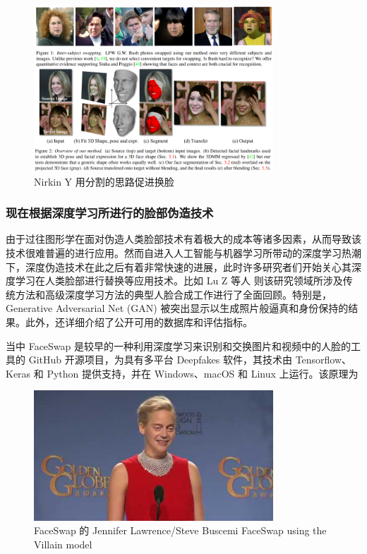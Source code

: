 \begin{figure}[htb]
\centering 
\includegraphics[width=0.80\textwidth]{img/ch1m6.png} 
\caption{Nirkin Y 用分割的思路促进换脸}
\label{Test}
\end{figure}

\subsubsection{现在根据深度学习所进行的脸部伪造技术}

由于过往图形学在面对伪造人类脸部技术有着极大的成本等诸多因素，从而导致该技术很难普遍的进行应用。然而自进入人工智能与机器学习所带动的深度学习热潮下，深度伪造技术在此之后有着非常快速的进展，此时许多研究者们开始关心其深度学习在人类脸部进行替换等应用技术。比如 Lu Z 等人 \cite{lu2017recent}则该研究领域所涉及传统方法和高级深度学习方法的典型人脸合成工作进行了全面回顾。特别是，Generative Adversarial Net (GAN) 被突出显示以生成照片般逼真和身份保持的结果。此外，还详细介绍了公开可用的数据库和评估指标。

当中 FaceSwap \cite{list1101} 是较早的一种利用深度学习来识别和交换图片和视频中的人脸的工具的 GitHub 开源项目，为具有多平台 Deepfakes 软件，其技术由 Tensorflow、Keras 和 Python 提供支持，并在 Windows、macOS 和 Linux 上运行。该原理为

\begin{figure}[htb]
\centering 
\includegraphics[width=0.80\textwidth]{img/ch1m7.png} 
\caption{FaceSwap 的 Jennifer Lawrence/Steve Buscemi FaceSwap using the Villain model}
\label{Test}
\end{figure}



